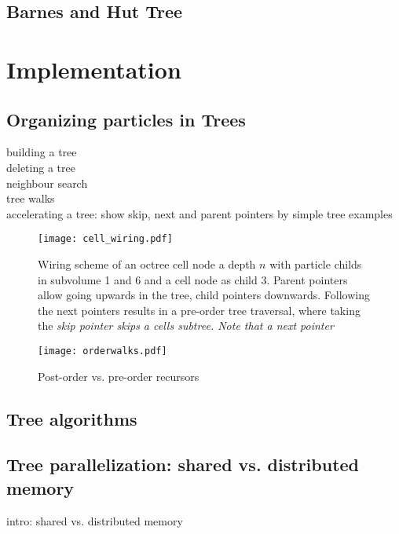 \subsection{Barnes and Hut Tree}







\section{Implementation}
\subsection{Organizing particles in Trees}
building a tree\\
deleting a tree\\
neighbour search\\
tree walks\\
accelerating a tree: show skip, next and parent pointers by simple tree examples\\

\begin{figure}[htbp]
\begin{center}
\texttt{[image: cell\_wiring.pdf]}
\caption{Wiring scheme of an octree cell node a depth $n$ with particle childs in subvolume 1 and 6 and a cell node as child 3. Parent pointers allow going upwards in the tree, child pointers downwards. Following the next pointers results in a pre-order tree traversal, where taking the \it{skip} pointer skips a cells subtree. Note that a \it{next} pointer }
\label{fig02walks}
\end{center}
\end{figure}


\begin{figure}[htbp]
\begin{center}
\texttt{[image: orderwalks.pdf]}
\caption{Post-order vs. pre-order recursors}
\label{fig02walks}
\end{center}
\end{figure}

\subsection{Tree algorithms}

\subsection{Tree parallelization: shared vs. distributed memory}
intro: shared vs. distributed memory\\

